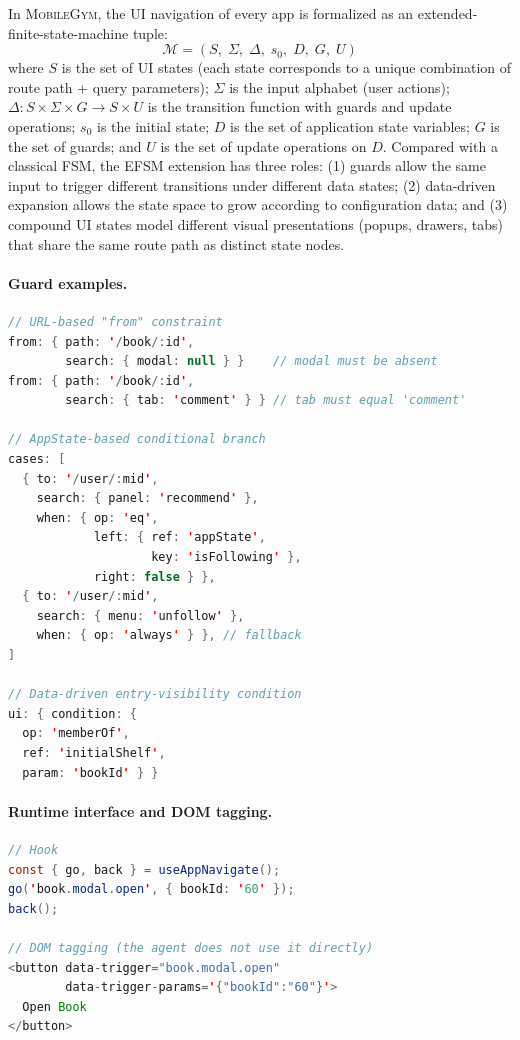\documentclass{llmxive}
\providecommand{\sys}{\textsc{MobileGym}}
\begin{document}
In \sys{}, the UI navigation of every app is formalized as an extended-finite-state-machine tuple:
\begin{equation*}
  \mathcal{M} = (S,\; \Sigma,\; \Delta,\; s_0,\; D,\; G,\; U)
\end{equation*}
where $S$ is the set of UI states (each state corresponds to a unique combination of route path + query parameters); $\Sigma$ is the input alphabet (user actions); $\Delta: S \times \Sigma \times G \to S \times U$ is the transition function with guards and update operations; $s_0$ is the initial state; $D$ is the set of application state variables; $G$ is the set of guards; and $U$ is the set of update operations on $D$. Compared with a classical FSM, the EFSM extension has three roles: (1) guards allow the same input to trigger different transitions under different data states; (2) data-driven expansion allows the state space to grow according to configuration data; and (3) compound UI states model different visual presentations (popups, drawers, tabs) that share the same route path as distinct state nodes.

\paragraph{Guard examples.}\mbox{}\par\medskip
\begin{lstlisting}[language=Java]
// URL-based "from" constraint
from: { path: '/book/:id',
        search: { modal: null } }    // modal must be absent
from: { path: '/book/:id',
        search: { tab: 'comment' } } // tab must equal 'comment'

// AppState-based conditional branch
cases: [
  { to: '/user/:mid',
    search: { panel: 'recommend' },
    when: { op: 'eq',
            left: { ref: 'appState',
                    key: 'isFollowing' },
            right: false } },
  { to: '/user/:mid',
    search: { menu: 'unfollow' },
    when: { op: 'always' } }, // fallback
]

// Data-driven entry-visibility condition
ui: { condition: {
  op: 'memberOf',
  ref: 'initialShelf',
  param: 'bookId' } }
\end{lstlisting}

\paragraph{Runtime interface and DOM tagging.}\mbox{}\par\medskip
\begin{lstlisting}[language=Java]
// Hook
const { go, back } = useAppNavigate();
go('book.modal.open', { bookId: '60' });
back();

// DOM tagging (the agent does not use it directly)
<button data-trigger="book.modal.open"
        data-trigger-params='{"bookId":"60"}'>
  Open Book
</button>
\end{lstlisting}
\end{document}
